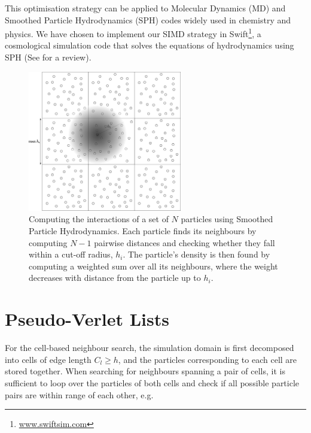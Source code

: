\documentclass{IOS-Book-Article}
\newcommand{\swift}{{\sc Swift}\xspace}
\begin{document}
This optimisation strategy can be applied to Molecular Dynamics (MD) and Smoothed Particle Hydrodynamics (SPH) codes widely used in chemistry and physics. We have chosen to implement our SIMD strategy in \swift\footnote{\url{www.swiftsim.com}}, a cosmological simulation code \cite{ref:SWIFT_SIAM, ref:SWIFT_PASC} that solves the equations of hydrodynamics using SPH (See \cite{ref:SPH_review} for a review).

\begin{figure}
  \centering
  \includegraphics[width=0.6\textwidth]{Figures/sph.eps}
  \caption{Computing the interactions of a set of $N$ particles using Smoothed Particle Hydrodynamics. Each particle finds its neighbours by computing $N - 1$ pairwise distances and checking whether they fall within a cut-off radius, $h_i$. The particle's density is then found by computing a weighted sum over all its neighbours, where the weight decreases with distance from the particle up to $h_i$.}
   \label{fig:sph}
\end{figure}

\section{Pseudo-Verlet Lists} \label{sec:pVl}

For the cell-based neighbour search, the simulation domain is first decomposed into cells of edge length $C_l \geqslant h$, and the particles corresponding to each cell are stored together. When searching for neighbours spanning a pair of cells, it is sufficient to loop over the particles of both cells and check if all possible particle pairs are within range of each other, e.g.
\end{document}
